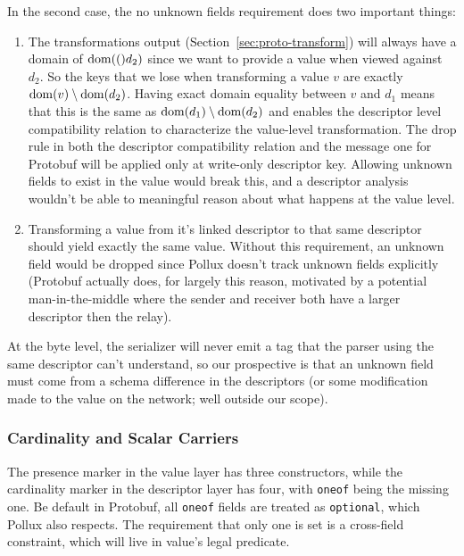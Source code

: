 In the second case, the no unknown fields requirement does two important
things:

\begin{enumerate}
\item The transformations output (Section~\ref{sec:proto-transform}) will always
  have a domain of $\mathrm{dom}(()d_2)$ since we want to provide a value when viewed
  against $d_2$. So the keys that we lose when transforming a value $v$ are
  exactly $\mathrm{dom}(v) \setminus \mathrm{dom}(d_2)$. Having exact domain equality between
  $v$ and $d_1$ means that this is the same as $\mathrm{dom}(d_1) \setminus \mathrm{dom}(d_2)$
  and enables the descriptor level compatibility relation to characterize the
  value-level transformation. The drop rule in both the descriptor compatibility
  relation and the message one for Protobuf will be applied only at write-only
  descriptor key. Allowing unknown fields to exist in the value would break
  this, and a descriptor analysis wouldn't be able to meaningful reason about
  what happens at the value level.
\item Transforming a value from it's linked descriptor to that same descriptor
  should yield exactly the same value. Without this requirement, an unknown field
  would be dropped since Pollux doesn't track unknown fields explicitly
  (Protobuf actually does, for largely this reason, motivated by a potential
  man-in-the-middle where the sender and receiver both have a larger descriptor
  then the relay).
\end{enumerate}

At the byte level, the serializer will never emit a tag that the parser using
the same descriptor can't understand, so our prospective is that an unknown
field must come from a schema difference in the descriptors (or some
modification made to the value on the network; well outside our scope).

\subsubsection{Cardinality and Scalar Carriers}

The presence marker in the value layer has three constructors, while the
cardinality marker in the descriptor layer has four, with \texttt{oneof} being
the missing one. Be default in Protobuf, all \texttt{oneof} fields are treated
as \texttt{optional}, which Pollux also respects. The requirement that only one
is set is a cross-field constraint, which will live in value's legal predicate.

